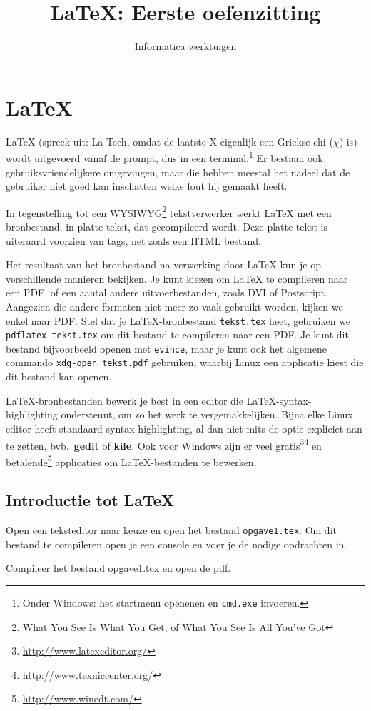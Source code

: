 \documentclass[12pt, dutch]{article}
\title{\LaTeX: Eerste oefenzitting}
\author{Informatica werktuigen}
\date{}
\begin{document}
\maketitle

\section{\LaTeX{}}

\LaTeX{} (spreek uit: La-Tech, omdat de laatste X eigenlijk een
Griekse chi ($\chi$) is) wordt uitgevoerd vanaf de prompt, dus in een
terminal.\footnote{Onder Windows: het startmenu openenen en \texttt{cmd.exe} invoeren.}
Er bestaan ook gebruiksvriendelijkere omgevingen, maar die hebben meestal het
nadeel dat de gebruiker niet goed kan inschatten welke fout hij gemaakt heeft.

In tegenstelling tot een WYSIWYG\footnote{What You See Is What You
  Get, of What You See Is All You've Got} tekstverwerker werkt
\LaTeX{} met een bronbestand, in platte tekst, dat gecompileerd wordt.
Deze platte tekst is uiteraard voorzien van tags, net zoals een HTML
bestand.

Het resultaat van het bronbestand na verwerking door \LaTeX{} kun je op
verschillende manieren bekijken. Je kunt kiezen om \LaTeX{} te compileren naar
een PDF, of een aantal andere uitvoerbestanden, zoals DVI of Postscript.
Aangezien die andere formaten niet meer zo vaak gebruikt worden, kijken we enkel
naar PDF. Stel dat je \LaTeX-bronbestand \texttt{tekst.tex} heet, gebruiken we
\texttt{pdflatex tekst.tex} om dit bestand te compileren naar een PDF. Je kunt
dit bestand bijvoorbeeld openen met \texttt{evince}, maar je kunt ook het
algemene commando \texttt{xdg-open tekst.pdf} gebruiken, waarbij Linux een
applicatie kiest die dit bestand kan openen.

\LaTeX{}-bronbestanden bewerk je best in een editor die \LaTeX{}-syntax-
highlighting ondersteunt, om zo het werk te vergemakkelijken. Bijna elke
Linux editor heeft standaard syntax highlighting, al dan niet mits de
optie expliciet aan te zetten, bvb.\ \textbf{gedit} of \textbf{kile}.
Ook voor Windows zijn er veel
gratis\footnote{\url{http://www.latexeditor.org/}}\footnote{\url{http://www.texniccenter.org/}}
en betalende\footnote{\url{http://www.winedt.com/}} applicaties om
\LaTeX{}-bestanden te bewerken.

\subsection{Introductie tot \LaTeX}
Open een teksteditor naar keuze en open het bestand \texttt{opgave1.tex}.
Om dit bestand te compileren open je een console en voer je de nodige opdrachten
in.
\begin{tcolorbox}[title=Opgave 1]
  Compileer het bestand opgave1.tex en open de pdf.
\end{tcolorbox}
\end{document}
